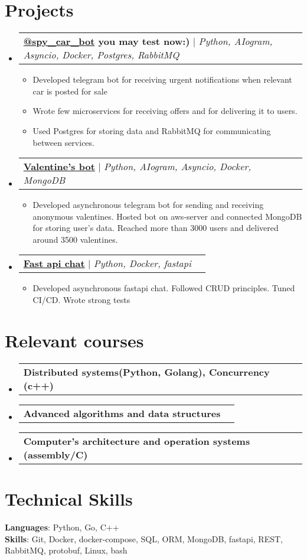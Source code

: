 \documentclass[letterpaper,11pt]{article}
\makeatletter
\newcommand{\resumeItem}[1]{
  \item\small{
    {#1 \vspace{-2pt}}
  }
}
\newcommand{\resumeProjectHeading}[2]{
    \item
    \begin{tabular*}{0.97\textwidth}{l@{\extracolsep{\fill}}r}
      \small#1 & #2 \\
    \end{tabular*}\vspace{-7pt}
}
\newcommand{\resumeSubHeadingListStart}{\begin{itemize}[leftmargin=0.15in, label={}]}
\newcommand{\resumeSubHeadingListEnd}{\end{itemize}}
\newcommand{\resumeItemListStart}{\begin{itemize}}
\newcommand{\resumeItemListEnd}{\end{itemize}\vspace{-5pt}}
\makeatother
\begin{document}
\section{Projects}
    \resumeSubHeadingListStart
     \resumeProjectHeading
    {\textbf{\href{https://t.me/spy_car_bot}{\color{blue}@spy\_car\_bot} you may test now:) } $|$ \emph{Python, AIogram, Asyncio, Docker, Postgres, RabbitMQ}}{}
    \resumeItemListStart
    \resumeItem{\normalsize{Developed telegram bot for receiving urgent notifications when relevant car is posted for sale}}
    \resumeItem{\normalsize{Wrote few microservices for receiving offers and for delivering it to users.}}
    \resumeItem{\normalsize{Used Postgres for storing data and RabbitMQ for communicating between services.}}
    \resumeItemListEnd
        \resumeProjectHeading
    {\textbf{\href{https://github.com/yasamprom/valentine}{\color{blue}Valentine's bot}} $|$ \emph{Python, AIogram, Asyncio, Docker, MongoDB}}{}
          \resumeItemListStart
            \resumeItem{\normalsize{Developed asynchronous telegram bot for sending and receiving anonymous valentines. Hosted bot on aws-server and connected MongoDB for storing user's data. Reached more than 3000 users and delivered around 3500 valentines.}}
        \resumeItemListEnd

    \resumeProjectHeading
{\textbf{\href{https://github.com/yasamprom/fastapichat}{\color{blue}Fast api chat}} $|$ \emph{Python, Docker, fastapi}}{}
        \resumeItemListStart
          \resumeItem{\normalsize{Developed asynchronous fastapi chat. Followed CRUD principles. Tuned CI/CD. Wrote strong tests}}
        \resumeItemListEnd


    \resumeSubHeadingListEnd

\section{Relevant courses}
    \resumeSubHeadingListStart
        \resumeProjectHeading
          {\textbf{Distributed systems(Python, Golang), Concurrency (c++)}}{}
        \resumeProjectHeading
          {\textbf{Advanced algorithms and data structures}}{}
        \resumeProjectHeading
          {\textbf{Computer's architecture and operation systems (assembly/C)}}{}
    \resumeSubHeadingListEnd

\section{Technical Skills}
 \begin{itemize}[leftmargin=0.15in, label={}]
    \small{\item{
     \textbf{Languages}{: Python, Go, C++} \\
     \textbf{Skills}{: Git, Docker, docker-compose, SQL, ORM, MongoDB, fastapi, REST, RabbitMQ, protobuf, Linux, bash} \\
    }}
 \end{itemize}
\end{document}
